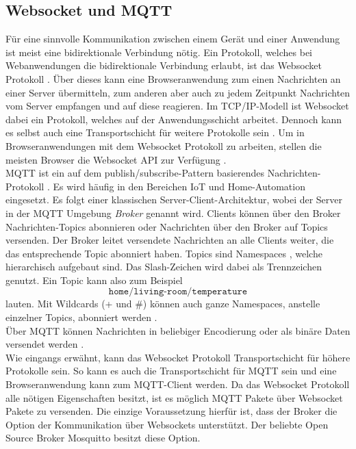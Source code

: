 \subsection{Websocket und MQTT}
\label{subs:websocket-und-mqtt}

Für eine sinnvolle Kommunikation zwischen einem Gerät und einer Anwendung ist meist
eine bidirektionale Verbindung nötig. Ein Protokoll, welches bei Webanwendungen die 
bidirektionale Verbindung erlaubt, ist das Websocket Protokoll \cite{rfc-websocket}. Über dieses
kann eine Browseranwendung zum einen Nachrichten an einer Server übermitteln, zum anderen 
aber auch zu jedem Zeitpunkt Nachrichten vom Server empfangen und auf diese reagieren.
Im TCP/IP-Modell ist Websocket dabei ein Protokoll, welches auf der Anwendungsschicht arbeitet. 
Dennoch kann es selbst auch eine Transportschicht für weitere Protokolle sein \cite{websocket-definitive}.
Um in Browseranwendungen mit dem Websocket Protokoll zu arbeiten, stellen die meisten 
Browser die Websocket API zur Verfügung \cite{websocket-api}.\\

MQTT ist ein auf dem publish/subscribe-Pattern basierendes Nachrichten-Protokoll \cite{mqtt-standard}.
Es wird häufig in den Bereichen IoT und Home-Automation eingesetzt. Es folgt einer
klassischen Server-Client-Architektur, wobei der Server in der MQTT Umgebung \emph{Broker}
genannt wird. Clients können über den Broker Nachrichten-Topics abonnieren oder Nachrichten
über den Broker auf Topics versenden. Der Broker leitet versendete Nachrichten an alle Clients
weiter, die das entsprechende Topic abonniert haben. Topics sind Namespaces , welche hierarchisch
aufgebaut sind. Das Slash-Zeichen wird dabei als Trennzeichen genutzt. Ein Topic kann also zum 
Beispiel 
\[\texttt{home/living-room/temperature} \]
lauten. Mit Wildcards (+ und \#) können auch ganze
Namespaces, anstelle einzelner Topics, abonniert werden \cite{mqtt-man-page}.\\
Über MQTT können Nachrichten in beliebiger Encodierung oder als binäre Daten versendet werden
\cite{mqtt-essentials-part-4}.\\

Wie eingangs erwähnt, kann das Websocket Protokoll Transportschicht für
höhere Protokolle sein. So kann es auch die Transportschicht für MQTT sein und eine Browseranwendung
kann zum MQTT-Client werden. Da das Websocket Protokoll alle nötigen Eigenschaften besitzt, ist es
möglich MQTT Pakete über Websocket Pakete zu versenden. Die einzige Voraussetzung hierfür ist, dass der Broker
die Option der Kommunikation über Websockets unterstützt. Der beliebte Open Source Broker Mosquitto \cite{mosquitto}
besitzt diese Option.